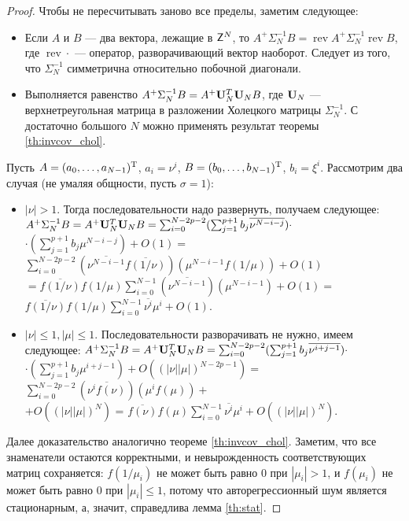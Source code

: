 \documentclass[12pt,a4paper]{article}
\def\rev{\mathop{\mathrm{rev}}}
\begin{document}
\begin{proof}
	Чтобы не пересчитывать заново все пределы, заметим следующее:
	\begin{itemize}
		\item Если $A$ и $B$ --- два вектора, лежащие в $\mathsf{Z}^N$, то $A^+ \Sigma_N^{-1} B = \rev{A}^+ \Sigma_N^{-1} \rev{B}$, где $\rev{\cdot}$ --- оператор, разворачивающий вектор наоборот. Следует из того, что $\Sigma_N^{-1}$ симметрична относительно побочной диагонали.
		\item Выполняется равенство $A^+ \Sigma_N^{-1} B = A^+ \mathbf{U}_N^T \mathbf{U}_N B$, где $\mathbf{U}_N$ --- верхнетреугольная матрица в разложении Холецкого матрицы $\Sigma_N^{-1}$. С достаточно большого $N$ можно применять результат теоремы \ref{th:invcov_chol}.
	\end{itemize}
	
	Пусть $A = (a_0, \ldots, a_{N - 1})^{\mathrm{T}}$, $a_i = \nu^i$, $B = (b_0, \ldots, b_{N - 1})^{\mathrm{T}}$, $b_i = \xi^i$. Рассмотрим два случая (не умаляя общности, пусть $\sigma = 1$):
	\begin{itemize}
		\item $|\nu| > 1$. Тогда последовательности надо развернуть, получаем следующее:
		$A^+ \Sigma_N^{-1} B = A^+ \mathbf{U}_N^T \mathbf{U}_N B = \sum_{i=0}^{N-{2p} -2} (\sum_{j=1}^{p+1}b_j \overline{\nu^{N - i - j}}) \cdot$ \\$\cdot (\sum_{j=1}^{p+1}b_j \mu^{N - i - j}) + O(1) = $ $\sum_{i=0}^{N-{2p} - 2} (\overline{\nu^{N - i - 1}} \overline{f(1/\nu)})  (\mu^{N - i - 1}f(1/\mu)) + O(1)$ $= \overline{f(1/\nu)} f(1/\mu)\sum_{i=0}^{N-1} (\overline{\nu^{N - i - 1}} ) (\mu^{N - i - 1}) + O(1) = $\\
		$\overline{f(1/\nu)} f(1/\mu)\sum_{i=0}^{N-1} \overline{\nu^i} \mu^i + O(1)$.
		\item $|\nu| \le 1, |\mu| \le 1$. Последовательности разворачивать не нужно, имеем следующее:
		$A^+ \Sigma_N^{-1} B = A^+ \mathbf{U}_N^T \mathbf{U}_N B = \sum_{i=0}^{N-{2p}-2} (\sum_{j=1}^{p+1}b_j \overline{\nu^{
				i + j - 1}}) \cdot$ \\$\cdot (\sum_{j=1}^{p+1}b_j \mu^{i + j - 1}) + O((|\nu||\mu|)^{N - 2p - 1}) =$  
		$\sum_{i=0}^{N-{2p} -2} (\overline{\nu^i f(\nu)})(\mu^i f(\mu)) +$\\ $+ O((|\nu||\mu|)^{N})$ = 
		$\overline{f(\nu)} f(\mu) \sum_{i=0}^{N-1} \overline{\nu^i} \mu^i + O((|\nu||\mu|)^{N})$.
	\end{itemize}
	
	Далее доказательство аналогично теореме \ref{th:invcov_chol}. Заметим, что все знаменатели остаются корректными, и невырожденность соответствующих матриц сохраняется: $f(1/\mu_i)$ не может быть равно $0$ при $|\mu_i| > 1$, и $f(\mu_i)$ не может быть равно $0$ при $|\mu_i| \le 1$, потому что авторегрессионный шум является стационарным, а, значит, справедлива лемма \ref{th:stat}.
\end{proof}
\end{document}
